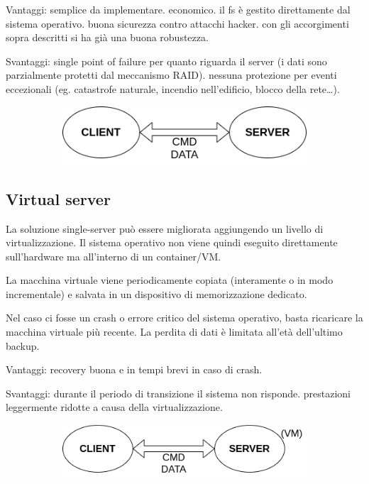 \documentclass{article}
\begin{document}
Vantaggi: semplice da implementare. economico. il fs è gestito direttamente dal sistema operativo. buona sicurezza contro attacchi hacker. con gli accorgimenti sopra descritti si ha già una buona robustezza.  

Svantaggi: single point of failure per quanto riguarda il server (i dati sono parzialmente protetti dal meccanismo RAID). nessuna protezione per eventi eccezionali (eg. catastrofe naturale, incendio nell'edificio, blocco della rete\dots). 

\begin{figure}[H]
	\centering
	\begin{subfigure}{0.80\linewidth}
		\includegraphics[width=\linewidth]{../diagrams/architettura/1.png}
	\end{subfigure}
\end{figure}



\subsection{Virtual server}

La soluzione single-server può essere migliorata aggiungendo un livello di virtualizzazione. 
Il sistema operativo non viene quindi eseguito direttamente sull'hardware ma all'interno di un container/VM. 

La macchina virtuale viene periodicamente copiata (interamente o in modo incrementale) e salvata in un dispositivo di memorizzazione dedicato. 

Nel caso ci fosse un crash o errore critico del sistema operativo, basta ricaricare la macchina virtuale più recente. La perdita di dati è limitata all'età dell'ultimo backup. 


Vantaggi: recovery buona e in tempi brevi in caso di crash. 

Svantaggi: durante il periodo di transizione il sistema non risponde. prestazioni leggermente ridotte a causa della virtualizzazione.

\begin{figure}[H]
	\centering
	\begin{subfigure}{0.80\linewidth}
		\includegraphics[width=\linewidth]{../diagrams/architettura/2.png}
	\end{subfigure}
\end{figure}
\end{document}
